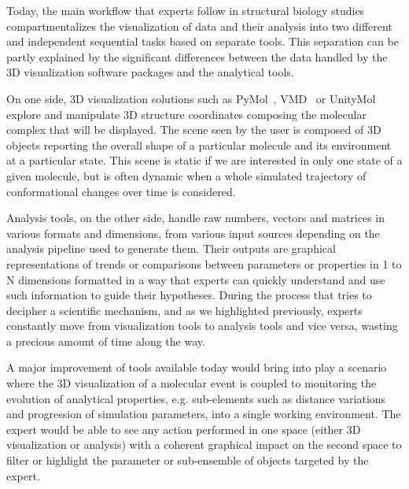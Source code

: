 \documentclass{vgtc}                          %
\begin{document}
Today, the main workflow that experts follow in structural biology studies compartmentalizes the visualization of data and their analysis into two different and independent sequential tasks based on separate tools. This separation can be partly explained by the significant differences between the data handled by the 3D visualization software packages and the analytical tools.

On one side, 3D visualization solutions such as PyMol~\cite{delano_pymol_2002}, VMD~\cite{humphrey_vmd:_1996} or UnityMol~\cite{lv2013game} explore and manipulate 3D structure coordinates composing the molecular complex that will be displayed. The scene seen by the user is composed of 3D objects reporting the overall shape of a particular molecule and its environment at a particular state. This scene is static if we are interested in only one state of a given molecule, but is often dynamic when a whole simulated trajectory of conformational changes over time is considered.

Analysis tools, on the other side, handle raw numbers, vectors and matrices in various formats and dimensions, from various input sources depending on the analysis pipeline used to generate them. Their outputs are graphical representations of trends or comparisons between parameters or properties in 1 to N dimensions formatted in a way that experts can quickly understand and use such information to guide their hypotheses.
During the process that tries to decipher a scientific mechanism, and as we highlighted previously, experts constantly move from visualization tools to analysis tools and vice versa, wasting a precious amount of time along the way.

A major improvement of tools available today would bring into play a scenario where the 3D visualization of a molecular event is coupled to monitoring the evolution of analytical properties, e.g. sub-elements such as distance variations and progression of simulation parameters, into a single working environment. The expert would be able to see any action performed in one space (either 3D visualization or analysis) with a coherent graphical impact on the second space to filter or highlight the parameter or sub-ensemble of objects targeted by the expert.
\end{document}
